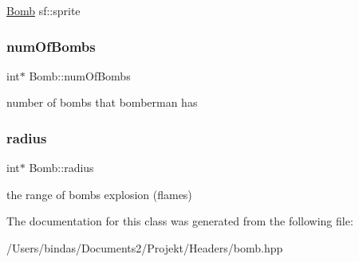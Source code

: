 \mbox{\hyperlink{class_bomb}{Bomb}} sf\+::sprite \mbox{\label{class_bomb_a5ad60c615e2101551eae9197a84c16b9}} 
\subsubsection{\texorpdfstring{numOfBombs}{numOfBombs}}
{\footnotesize\ttfamily int$\ast$ Bomb\+::num\+Of\+Bombs}

number of bombs that bomberman has \mbox{\label{class_bomb_a7a23eb43b769a5d5fb79e76e6e969d5b}} 
\subsubsection{\texorpdfstring{radius}{radius}}
{\footnotesize\ttfamily int$\ast$ Bomb\+::radius}

the range of bomb\textquotesingle{}s explosion (flames) 

The documentation for this class was generated from the following file\+:\begin{DoxyCompactItemize}
\item 
/\+Users/bindas/\+Documents2/\+Projekt/\+Headers/bomb.\+hpp\end{DoxyCompactItemize}
